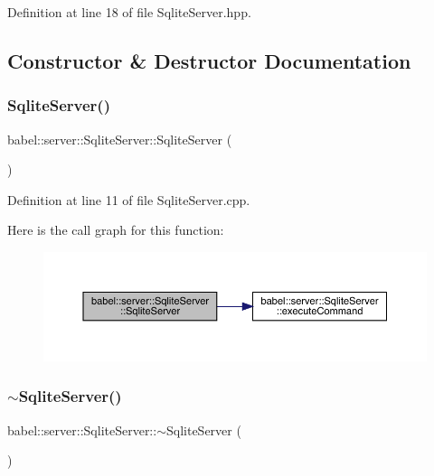 Definition at line 18 of file Sqlite\+Server.\+hpp.



\subsection{Constructor \& Destructor Documentation}
\mbox{\label{classbabel_1_1server_1_1_sqlite_server_a51ccab47c4de4410853fb212a5a6d5f9}} 
\subsubsection{\texorpdfstring{Sqlite\+Server()}{SqliteServer()}}
{\footnotesize\ttfamily babel\+::server\+::\+Sqlite\+Server\+::\+Sqlite\+Server (\begin{DoxyParamCaption}{ }\end{DoxyParamCaption})}



Definition at line 11 of file Sqlite\+Server.\+cpp.

Here is the call graph for this function\+:\nopagebreak
\begin{figure}[H]
\begin{center}
\leavevmode
\includegraphics[width=350pt]{classbabel_1_1server_1_1_sqlite_server_a51ccab47c4de4410853fb212a5a6d5f9_cgraph}
\end{center}
\end{figure}
\mbox{\label{classbabel_1_1server_1_1_sqlite_server_ac5cb387c4d9cd38a66f259dfc1061702}} 
\subsubsection{\texorpdfstring{$\sim$\+Sqlite\+Server()}{~SqliteServer()}}
{\footnotesize\ttfamily babel\+::server\+::\+Sqlite\+Server\+::$\sim$\+Sqlite\+Server (\begin{DoxyParamCaption}{ }\end{DoxyParamCaption})\hspace{0.3cm}{\ttfamily [virtual]}}



